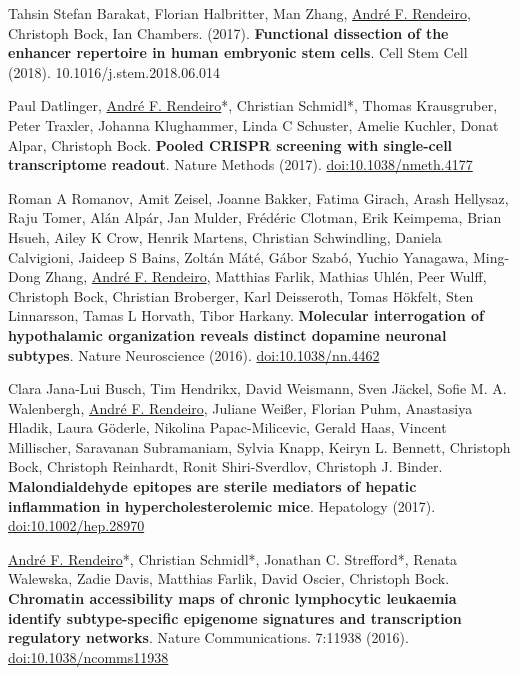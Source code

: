 \documentclass[11pt,a4paper,roman]{moderncv} %
\begin{document}
\begin{etaremune}[leftmargin=1.0cm, itemindent=0pt, topsep=10pt, itemsep=2pt, partopsep=0pt, parsep=0pt]
        \item Tahsin Stefan Barakat, Florian Halbritter, Man Zhang, \underline{André F. Rendeiro}, Christoph Bock, Ian Chambers. (2017). \textbf{Functional dissection of the enhancer repertoire in human embryonic stem cells}. Cell Stem Cell (2018). 10.1016/j.stem.2018.06.014
        \item Paul Datlinger, \underline{André F. Rendeiro}*, Christian Schmidl*, Thomas Krausgruber, Peter Traxler, Johanna Klughammer, Linda C Schuster, Amelie Kuchler, Donat Alpar, Christoph Bock. \textbf{Pooled CRISPR screening with single-cell transcriptome readout}. Nature Methods (2017).
        \href{https://dx.doi.org/10.1038/nmeth.4177}{doi:10.1038/nmeth.4177}

        \item Roman A Romanov, Amit Zeisel, Joanne Bakker, Fatima Girach, Arash Hellysaz, Raju Tomer, Alán Alpár, Jan Mulder, Frédéric Clotman, Erik Keimpema, Brian Hsueh, Ailey K Crow, Henrik Martens, Christian Schwindling, Daniela Calvigioni, Jaideep S Bains, Zoltán Máté, Gábor Szabó, Yuchio Yanagawa, Ming-Dong Zhang, \underline{André F. Rendeiro}, Matthias Farlik, Mathias Uhlén, Peer Wulff, Christoph Bock, Christian Broberger, Karl Deisseroth, Tomas Hökfelt, Sten Linnarsson, Tamas L Horvath, Tibor Harkany. \textbf{Molecular interrogation of hypothalamic organization reveals distinct dopamine neuronal subtypes}. Nature Neuroscience (2016).
        \href{https://dx.doi.org/10.1038/nn.4462}{doi:10.1038/nn.4462}

        \item Clara Jana-Lui Busch, Tim Hendrikx, David Weismann, Sven Jäckel, Sofie M. A. Walenbergh, \underline{André F. Rendeiro}, Juliane Weißer, Florian Puhm, Anastasiya Hladik, Laura Göderle, Nikolina Papac-Milicevic, Gerald Haas, Vincent Millischer, Saravanan Subramaniam, Sylvia Knapp, Keiryn L. Bennett, Christoph Bock, Christoph Reinhardt, Ronit Shiri-Sverdlov, Christoph J. Binder. \textbf{Malondialdehyde epitopes are sterile mediators of hepatic inflammation in hypercholesterolemic mice}. Hepatology (2017).
        \href{https://dx.doi.org/10.1002/hep.28970}{doi:10.1002/hep.28970}

        \item \underline{André F. Rendeiro}*, Christian Schmidl*, Jonathan C. Strefford*, Renata Walewska, Zadie Davis, Matthias Farlik, David Oscier, Christoph Bock. \textbf{Chromatin accessibility maps of chronic lymphocytic leukaemia identify subtype-specific epigenome signatures and transcription regulatory networks}. Nature Communications. 7:11938 (2016).
        \href{https://dx.doi.org/10.1038/ncomms11938}{doi:10.1038/ncomms11938}


\end{etaremune}
\end{document}
